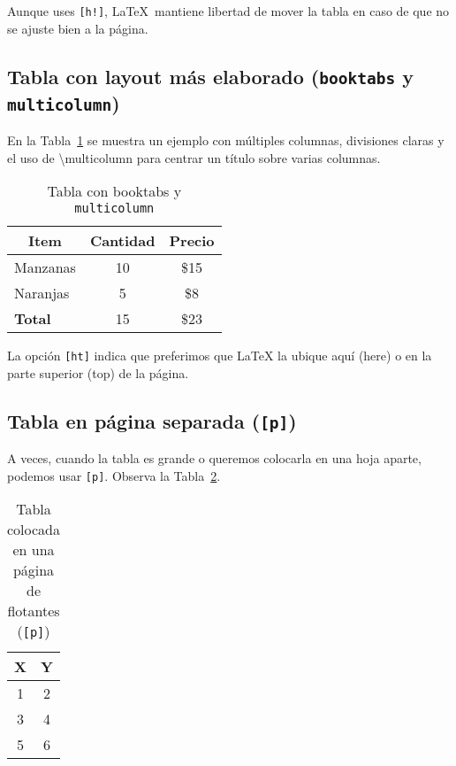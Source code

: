 \documentclass{article}
\begin{document}
Aunque uses \texttt{[h!]}, \LaTeX\ mantiene libertad de mover la tabla
en caso de que no se ajuste bien a la página.

\subsection{Tabla con layout más elaborado (\texttt{booktabs} y \texttt{multicolumn})}

En la Tabla~\ref{tab:multicol} se muestra un ejemplo con múltiples columnas,
divisiones claras y el uso de \textbackslash multicolumn para centrar un título
sobre varias columnas.

\begin{table}[ht]
    \centering
    \caption{Tabla con booktabs y \texttt{multicolumn}}
    \label{tab:multicol}
    \begin{tabular}{lcc}
    \toprule
    \multicolumn{1}{c}{\textbf{Item}} & \textbf{Cantidad} & \textbf{Precio} \\
    \midrule
    Manzanas & 10 & \$15 \\
    Naranjas & 5  & \$8  \\
    \midrule
    \textbf{Total} & 15 & \$23 \\
    \bottomrule
    \end{tabular}
\end{table}

La opción \texttt{[ht]} indica que preferimos que LaTeX la ubique aquí (here)
o en la parte superior (top) de la página.

\subsection{Tabla en página separada (\texttt{[p]})}

A veces, cuando la tabla es grande o queremos colocarla en 
una hoja aparte, podemos usar \texttt{[p]}. Observa la 
Tabla~\ref{tab:page}.

\begin{table}[p]
    \centering
    \caption{Tabla colocada en una página de flotantes (\texttt{[p]})}
    \label{tab:page}
    \begin{tabular}{c c}
    \toprule
    \textbf{X} & \textbf{Y} \\
    \midrule
    1 & 2 \\
    3 & 4 \\
    5 & 6 \\
    \bottomrule
    \end{tabular}
\end{table}
\end{document}
